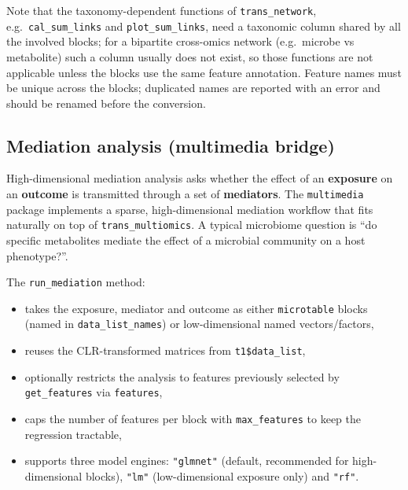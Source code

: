 \documentclass[
]{book}
\providecommand{\tightlist}{%
  \setlength{\itemsep}{0pt}\setlength{\parskip}{0pt}}
\begin{document}
Note that the taxonomy-dependent functions of \texttt{trans\_network}, e.g.~\texttt{cal\_sum\_links} and \texttt{plot\_sum\_links}, need a taxonomic column shared by all the involved blocks; for a bipartite cross-omics network (e.g.~microbe vs metabolite) such a column usually does not exist, so those functions are not applicable unless the blocks use the same feature annotation.
Feature names must be unique across the blocks; duplicated names are reported with an error and should be renamed before the conversion.

\subsection{Mediation analysis (multimedia bridge)}\label{mediation-analysis-multimedia-bridge}

High-dimensional mediation analysis asks whether the effect of an \textbf{exposure} on an \textbf{outcome} is transmitted through a set of \textbf{mediators}.
The \texttt{multimedia} package implements a sparse, high-dimensional mediation workflow \citep{Jiang_multimedia_2024} that fits naturally on top of \texttt{trans\_multiomics}.
A typical microbiome question is ``do specific metabolites mediate the effect of a microbial community on a host phenotype?''.

The \texttt{run\_mediation} method:

\begin{itemize}
\tightlist
\item
  takes the exposure, mediator and outcome as either \texttt{microtable} blocks (named in \texttt{data\_list\_names}) or low-dimensional named vectors/factors,
\item
  reuses the CLR-transformed matrices from \texttt{t1\$data\_list},
\item
  optionally restricts the analysis to features previously selected by \texttt{get\_features} via \texttt{features},
\item
  caps the number of features per block with \texttt{max\_features} to keep the regression tractable,
\item
  supports three model engines: \texttt{"glmnet"} (default, recommended for high-dimensional blocks), \texttt{"lm"} (low-dimensional exposure only) and \texttt{"rf"}.
\end{itemize}
\end{document}
